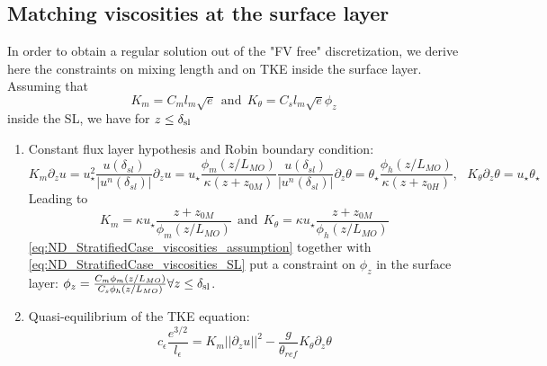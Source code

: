 \subsection{Matching viscosities at the surface layer}
In order to obtain a regular solution out of the "FV free"
discretization, we derive here the constraints on mixing length
and on TKE inside the surface layer.
Assuming that 
\begin{equation}
	\label{eq:ND_StratifiedCase_viscosities_assumption}
K_m = C_m l_m \sqrt{e} ~~\text{and}~~
K_\theta = C_s l_m \sqrt{e} \phi_z
\end{equation}
 inside the SL, we have
for $z\leq \delta_{\rm sl}$
\begin{enumerate}
\item Constant flux layer hypothesis and Robin boundary condition:
\begin{subequations}
\begin{equation}
	\label{eq:ND_StratifiedCase_K_partial_z_u}
	K_m \partial_z u = u_\star^2 \frac{u(\delta_{sl})}{|u^n(\delta_{sl})|}
\end{equation}
\begin{equation}
	\label{eq:ND_StratifiedCase_partial_z_u}
	\partial_z u = u_\star \frac{\phi_m(z/L_{MO})}{\kappa (z + z_{0M})}\frac{u(\delta_{sl})}{|u^n(\delta_{sl})|}
\end{equation}
\begin{equation}
	\label{eq:ND_StratifiedCase_partial_z_theta}
	\partial_z \theta = \theta_\star \frac{\phi_h(z/L_{MO})}{\kappa (z + z_{0H})}, ~~~ K_\theta \partial_z \theta = u_\star \theta_\star
\end{equation}
\end{subequations}
Leading to 
\begin{equation}
	\label{eq:ND_StratifiedCase_viscosities_SL}
	K_m = \kappa u_\star\frac{z+ z_{0M}}{\phi_m(z/L_{MO})} ~~\text{and}~~
K_\theta = \kappa u_\star\frac{z+ z_{0M}}{\phi_h(z/L_{MO})}
\end{equation}
\eqref{eq:ND_StratifiedCase_viscosities_assumption}
together with \eqref{eq:ND_StratifiedCase_viscosities_SL} put
a constraint on $\phi_z$ in the surface layer:
$\phi_z = \frac{C_m\phi_m(z/L_{MO})}{C_s\phi_h(z/L_{MO})}
		\forall z\leq \delta_{\rm sl}$.
\item Quasi-equilibrium of the TKE equation:
\begin{equation}
	\label{eq:ND_StratifiedCase_TKE_quasi_equilibrium}
	c_\epsilon \frac{e^{3/2}}{l_\epsilon}=K_m ||\partial_z u||^2 - \frac{g}{\theta_{ref}} K_\theta \partial_z \theta
\end{equation}
\end{enumerate}
